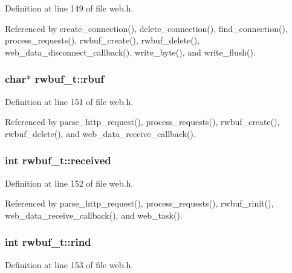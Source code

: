 Definition at line 149 of file web.\-h.



Referenced by create\-\_\-connection(), delete\-\_\-connection(), find\-\_\-connection(), process\-\_\-requests(), rwbuf\-\_\-create(), rwbuf\-\_\-delete(), web\-\_\-data\-\_\-disconnect\-\_\-callback(), write\-\_\-byte(), and write\-\_\-flush().

\hypertarget{structrwbuf__t_afd83372241273849c9395d587b146021}{
\subsubsection[{rbuf}]{\setlength{\rightskip}{0pt plus 5cm}char$\ast$ rwbuf\-\_\-t\-::rbuf}}\label{structrwbuf__t_afd83372241273849c9395d587b146021}


Definition at line 151 of file web.\-h.



Referenced by parse\-\_\-http\-\_\-request(), process\-\_\-requests(), rwbuf\-\_\-create(), rwbuf\-\_\-delete(), and web\-\_\-data\-\_\-receive\-\_\-callback().

\hypertarget{structrwbuf__t_ac76412a0fbf9dc009ae3f8bb20660883}{
\subsubsection[{received}]{\setlength{\rightskip}{0pt plus 5cm}int rwbuf\-\_\-t\-::received}}\label{structrwbuf__t_ac76412a0fbf9dc009ae3f8bb20660883}


Definition at line 152 of file web.\-h.



Referenced by parse\-\_\-http\-\_\-request(), process\-\_\-requests(), rwbuf\-\_\-rinit(), web\-\_\-data\-\_\-receive\-\_\-callback(), and web\-\_\-task().

\hypertarget{structrwbuf__t_ad5cbf7a78a5f5d9aa75b38f90e0fb6af}{
\subsubsection[{rind}]{\setlength{\rightskip}{0pt plus 5cm}int rwbuf\-\_\-t\-::rind}}\label{structrwbuf__t_ad5cbf7a78a5f5d9aa75b38f90e0fb6af}


Definition at line 153 of file web.\-h.



